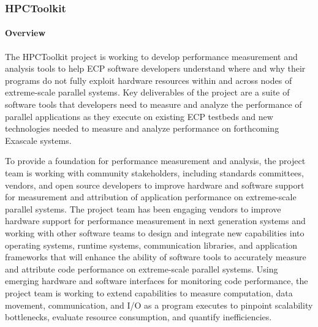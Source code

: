 
\subsubsection{ HPCToolkit} 
\paragraph{Overview} 

The HPCToolkit project is working to develop performance measurement and analysis tools to help ECP software developers understand where and why their programs do not fully exploit hardware resources within and across nodes of extreme-scale parallel systems. Key deliverables of the project are a suite of software tools that developers need to measure and analyze the performance of parallel applications as they execute on existing ECP testbeds and new technologies needed to measure and analyze performance on forthcoming Exascale systems.

To provide a foundation for performance measurement and analysis, the project team is working with community stakeholders, including standards committees, vendors, and open source developers to improve hardware and software support for measurement and attribution of application performance on extreme-scale parallel systems. The project team has been engaging vendors to improve
 hardware support for performance measurement in next generation systems and working with other software teams to design and integrate new capabilities into operating systems, runtime systems, communication libraries, and application frameworks that will enhance the ability of software tools to accurately measure and attribute code performance on extreme-scale parallel systems.  Using emerging hardware and software interfaces for monitoring code performance, the project team is working to extend capabilities to measure computation, data movement, communication, and I/O as a program executes to pinpoint scalability bottlenecks, evaluate resource consumption, and quantify inefficiencies. 





